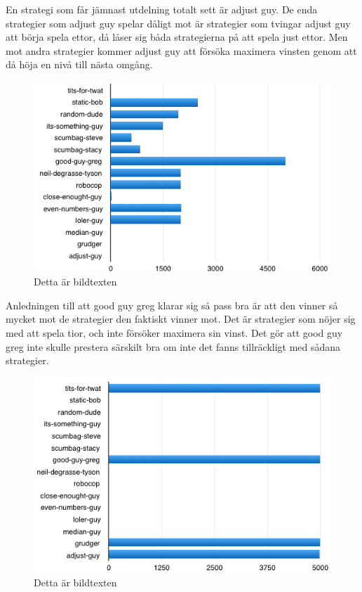 En strategi som får jämnast utdelning totalt sett är adjust guy. De enda strategier som adjust guy spelar dåligt mot är strategier som tvingar adjust guy att börja spela ettor, då låser sig båda strategierna på att spela just ettor. Men mot andra strategier kommer adjust guy att försöka maximera vinsten genom att då höja en nivå till nästa omgång.
\begin{figure}[H]
	\begin{center}
	\includegraphics[scale=0.75, angle=0]{bilder/adjust-guy.png}
	\caption{Detta är bildtexten}
	\label{adjust-guy}
	\end{center}
\end{figure}
Anledningen till att good guy greg klarar sig så pass bra är att den vinner så mycket mot de strategier den faktiskt vinner mot. Det är strategier som nöjer sig med att spela tior, och inte försöker maximera sin vinst. Det gör att good guy greg inte skulle prestera särskilt bra om inte det fanns tillräckligt med sådana strategier.

\begin{figure}[H]
	\begin{center}
	\includegraphics[scale=0.75, angle=0]{bilder/good-guy-greg.png}
	\caption{Detta är bildtexten}
	\label{good-guy-greg}
	\end{center}
\end{figure}

